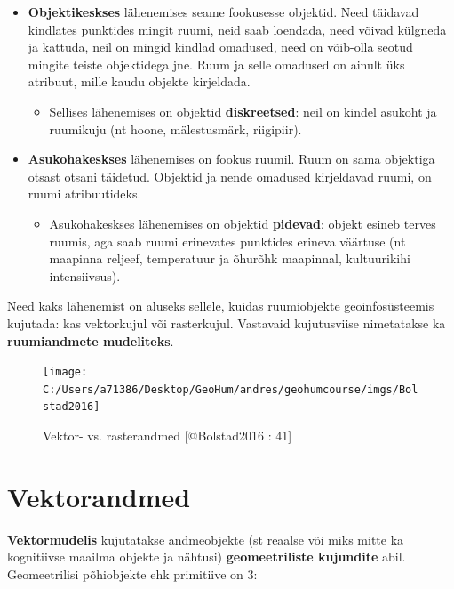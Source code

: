 \documentclass[
]{book}
\providecommand{\tightlist}{%
  \setlength{\itemsep}{0pt}\setlength{\parskip}{0pt}}
\begin{document}
\begin{itemize}
\tightlist
\item
  \textbf{Objektikeskses} lähenemises seame fookusesse objektid. Need täidavad kindlates punktides mingit ruumi, neid saab loendada, need võivad külgneda ja kattuda, neil on mingid kindlad omadused, need on võib-olla seotud mingite teiste objektidega jne. Ruum ja selle omadused on ainult üks atribuut, mille kaudu objekte kirjeldada.

  \begin{itemize}
  \tightlist
  \item
    Sellises lähenemises on objektid \textbf{diskreetsed}: neil on kindel asukoht ja ruumikuju (nt hoone, mälestusmärk, riigipiir).\\
  \end{itemize}
\item
  \textbf{Asukohakeskses} lähenemises on fookus ruumil. Ruum on sama objektiga otsast otsani täidetud. Objektid ja nende omadused kirjeldavad ruumi, on ruumi atribuutideks.

  \begin{itemize}
  \tightlist
  \item
    Asukohakeskses lähenemises on objektid \textbf{pidevad}: objekt esineb terves ruumis, aga saab ruumi erinevates punktides erineva väärtuse (nt maapinna reljeef, temperatuur ja õhurõhk maapinnal, kultuurikihi intensiivsus).
  \end{itemize}
\end{itemize}

Need kaks lähenemist on aluseks sellele, kuidas ruumiobjekte geoinfosüsteemis kujutada: kas vektorkujul või rasterkujul. Vastavaid kujutusviise nimetatakse ka \textbf{ruumiandmete mudeliteks}.

\begin{figure}

{\centering \texttt{[image: C:/Users/a71386/Desktop/GeoHum/andres/geohumcourse/imgs/Bolstad2016]} 

}

\caption{Vektor- vs. rasterandmed [@Bolstad2016 : 41]}\label{fig:data-models}
\end{figure}

\hypertarget{vektorandmed}{%
\section{Vektorandmed}\label{vektorandmed}}

\textbf{Vektormudelis} kujutatakse andmeobjekte (st reaalse või miks mitte ka kognitiivse maailma objekte ja nähtusi) \textbf{geomeetriliste kujundite} abil.
Geomeetrilisi põhiobjekte ehk primitiive on 3:
\end{document}
